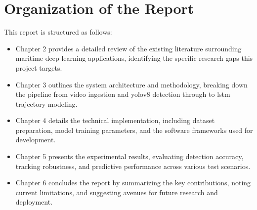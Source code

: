\section[Organization of the Report]{\textbf{Organization of the Report}}
This report is structured as follows:
\begin{itemize}
\item Chapter 2 provides a detailed review of the existing literature surrounding maritime deep learning applications, identifying the specific research gaps this project targets.
\item Chapter 3 outlines the system architecture and methodology, breaking down the pipeline from video ingestion and \gls{yolov8} detection through to \gls{lstm} trajectory modeling.
\item Chapter 4 details the technical implementation, including dataset preparation, model training parameters, and the software frameworks used for development.
\item Chapter 5 presents the experimental results, evaluating detection accuracy, tracking robustness, and predictive performance across various test scenarios.
\item Chapter 6 concludes the report by summarizing the key contributions, noting current limitations, and suggesting avenues for future research and deployment.
\end{itemize}